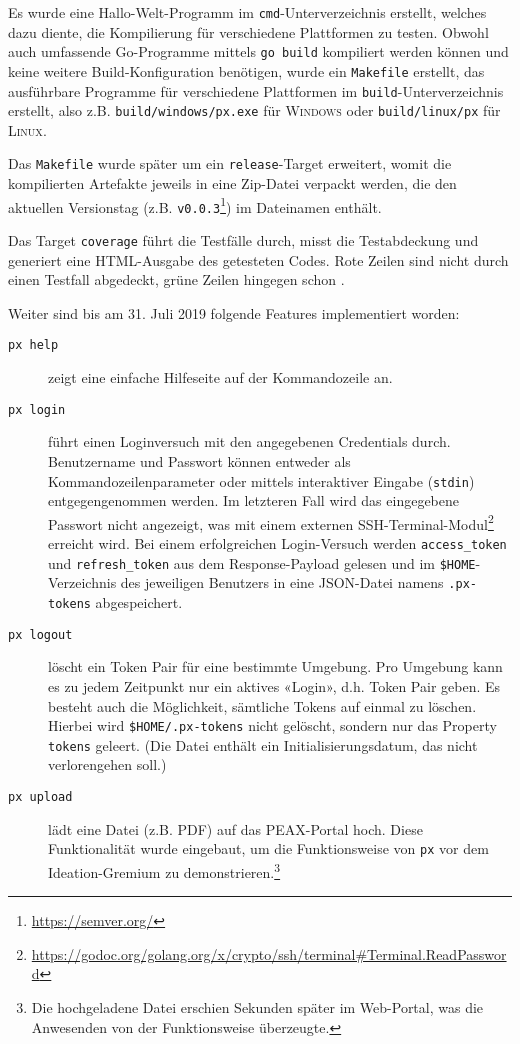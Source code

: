 Es wurde eine Hallo-Welt-Programm im \texttt{cmd}-Unterverzeichnis \cite[S. 293]{gopl} erstellt, welches dazu diente, die Kompilierung für verschiedene Plattformen zu testen. Obwohl auch umfassende Go-Programme mittels \texttt{go build} kompiliert werden können und keine weitere Build-Konfiguration benötigen, wurde ein \texttt{Makefile} erstellt, das ausführbare Programme für verschiedene Plattformen im \texttt{build}-Unter\-ver\-zeich\-nis erstellt, also z.B. \texttt{build/windows/px.exe} für \textsc{Windows} oder \texttt{build/linux/px} für \textsc{Linux}.

Das \texttt{Makefile} wurde später um ein \texttt{release}-Target erweitert, womit die kompilierten Artefakte jeweils in eine Zip-Datei verpackt werden, die den aktuellen Versionstag (z.B. \texttt{v0.0.3}\footnote{\url{https://semver.org/}}) im Dateinamen enthält.

Das Target \texttt{coverage} führt die Testfälle durch, misst die Testabdeckung und generiert eine HTML-Ausgabe des getesteten Codes. Rote Zeilen sind nicht durch einen Testfall abgedeckt, grüne Zeilen hingegen schon \cite[Kapitel 11.3]{gopl}.

Weiter sind bis am 31. Juli 2019 folgende Features implementiert worden:

\begin{description}
	\item[\texttt{px help}] zeigt eine einfache Hilfeseite auf der Kommandozeile an.
    \item[\texttt{px login}] führt einen Loginversuch mit den angegebenen Credentials durch. Benutzername und Passwort können entweder als Kommandozeilenparameter oder mittels interaktiver Eingabe (\texttt{stdin}) entgegengenommen werden. Im letzteren Fall wird das eingegebene Passwort nicht angezeigt, was mit einem externen SSH-Ter\-mi\-nal-Modul\footnote{\url{https://godoc.org/golang.org/x/crypto/ssh/terminal\#Terminal.ReadPassword}} erreicht wird. Bei einem erfolgreichen Login-Versuch werden \texttt{access\_token} und \texttt{refresh\_token} aus dem Response-Payload gelesen und im \texttt{\$HOME}-Ver\-zeich\-nis des jeweiligen Benutzers in eine JSON-Datei namens \texttt{.px-tokens} abgespeichert.
	\item[\texttt{px logout}] löscht ein Token Pair für eine bestimmte Umgebung. Pro Umgebung kann es zu jedem Zeitpunkt nur ein aktives «Login», d.h. Token Pair geben. Es besteht auch die Möglichkeit, sämtliche Tokens auf einmal zu löschen. Hierbei wird \texttt{\$HOME/.px-tokens} nicht gelöscht, sondern nur das Property \texttt{tokens} geleert. (Die Datei enthält ein Initialisierungsdatum, das nicht verlorengehen soll.)
	\item[\texttt{px upload}] lädt eine Datei (z.B. PDF) auf das PEAX-Portal hoch. Diese Funktionalität wurde eingebaut, um die Funktionsweise von \texttt{px} vor dem Ideation-Gremium zu demonstrieren.\footnote{Die hochgeladene Datei erschien Sekunden später im Web-Portal, was die Anwesenden von der Funktionsweise überzeugte.}
\end{description}

